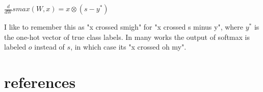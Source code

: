 \documentclass{article}
\begin{document}
$\frac{d}{dW} smax(W,x) = x \otimes (s - y^{*})$

I like to remember this as "x crossed smigh" for "x crossed s minus y", where $y^{*}$ is the one-hot vector of true class labels. In many works the output of softmax is labeled $o$ instead of $s$, in which case its "x crossed oh my".




\section{references}
\end{document}
